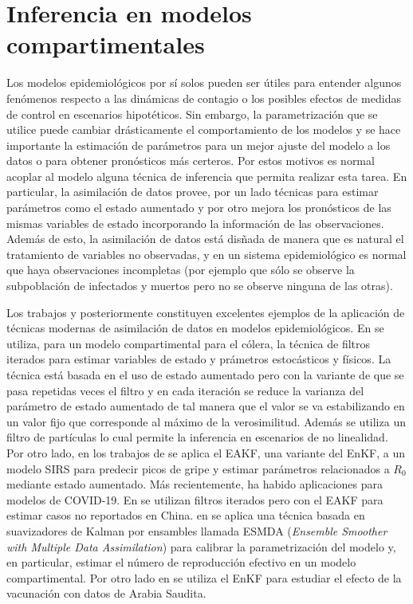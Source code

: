 \section{Inferencia en modelos compartimentales}

Los modelos epidemiológicos por sí solos pueden ser útiles para entender algunos fenómenos respecto a las dinámicas de contagio o los posibles efectos de medidas de control en escenarios hipotéticos. Sin embargo, la parametrización que se utilice puede cambiar drásticamente el comportamiento de los modelos y se hace importante la estimación de parámetros para un mejor ajuste del modelo a los datos o para obtener pronósticos más certeros. Por estos motivos es normal acoplar al modelo alguna técnica de inferencia que permita realizar esta tarea. En particular, la asimilación de datos provee, por un lado técnicas para estimar parámetros como el estado aumentado y por otro mejora los pronósticos de las mismas variables de estado incorporando la información de las observaciones. Además de esto, la asimilación de datos está disñada de manera que es natural el tratamiento de variables no observadas, y en un sistema epidemiológico es normal que haya observaciones incompletas (por ejemplo que sólo se observe la subpoblación de infectados y muertos pero no se observe ninguna de las otras). 

Los trabajos \cite{Ionides2006} y posteriormente \cite{Shaman2012, Shaman2013} constituyen excelentes ejemplos de la aplicación de técnicas modernas de asimilación de datos en modelos epidemiológicos. En \cite{Ionides2006} se utiliza, para un modelo compartimental para el cólera, la técnica de filtros iterados para estimar variables de estado y prámetros estocásticos y físicos. La técnica está basada en el uso de estado aumentado pero con la variante de que se pasa repetidas veces el filtro y en cada iteración se reduce la varianza del parámetro de estado aumentado de tal manera que el valor se va estabilizando en un valor fijo que corresponde al máximo de la verosimilitud. Además se utiliza un filtro de partículas lo cual permite la inferencia en escenarios de no linealidad. Por otro lado, en los trabajos de \cite{Shaman2012, Shaman2013} se aplica el EAKF, una variante del EnKF, a un modelo SIRS para predecir picos de gripe y estimar parámetros relacionados a $R_0$ mediante estado aumentado. Más recientemente, ha habido aplicaciones para modelos de COVID-19. En \cite{Li2020} se utilizan filtros iterados pero con el EAKF para estimar casos no reportados en China. en \cite{Evensen2020} se aplica una técnica basada en suavizadores de Kalman por ensambles llamada ESMDA (\textit{Ensemble Smoother with Multiple Data Assimilation}) para calibrar la parametrización del modelo y, en particular, estimar el número de reproducción efectivo en un modelo compartimental. Por otro lado en \cite{Ghostine2021} se utiliza el EnKF para estudiar el efecto de la vacunación con datos de Arabia Saudita.

